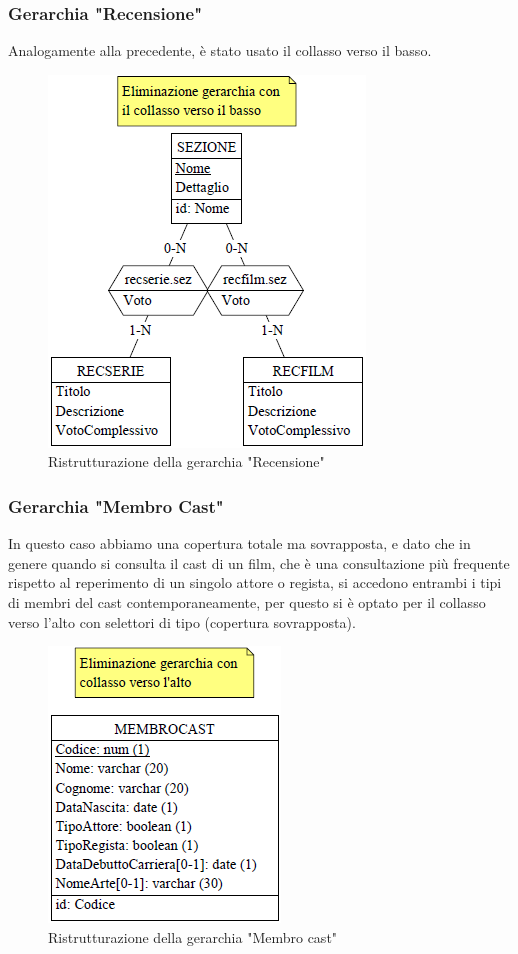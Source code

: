 \documentclass[a4paper,12pt]{report}
\begin{document}
\subsubsection{Gerarchia "Recensione"}
Analogamente alla precedente, è stato usato il collasso verso il basso.
\begin{figure}[H]
	\centering
	\includegraphics{ER/ristrutturazione/ristrecensione.png}
	\caption{Ristrutturazione della gerarchia "Recensione"}
\end{figure}
\subsubsection{Gerarchia "Membro Cast"}
In questo caso abbiamo una copertura totale ma sovrapposta, e dato che in genere quando si consulta il cast di un film, che è una consultazione più frequente rispetto al reperimento di un singolo attore o regista, si accedono entrambi i tipi di membri del cast contemporaneamente, per questo si è optato per il collasso verso l'alto con selettori di tipo (copertura sovrapposta).
\begin{figure}[H]
	\centering
	\includegraphics{ER/ristrutturazione/ristmembrocast.png}
	\caption{Ristrutturazione della gerarchia "Membro cast"}
\end{figure}
\end{document}
